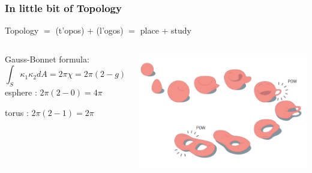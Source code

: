 \begin{frame}
    \frametitle{In little bit of Topology}

    Topology $=$ (\textgreek{t'opos}) $+$ (\textgreek{l'ogos})
    $=$ place $+$ study


    \begin{columns}
        \begin{block}{Gauss-Bonnet formula:}
            \begin{equation}
                \int_S \kappa_1 \kappa_2 dA = 2\pi\chi = 2\pi(2-g)
            \end{equation}
                esphere : $2\pi (2-0) = 4\pi$

                torus : $2\pi (2-1) = 2\pi$
        \end{block}
        \includegraphics[width=.9\textwidth]{phases_of_matter/topological_transitions_geometry.png}
    \end{columns}

\end{frame}

